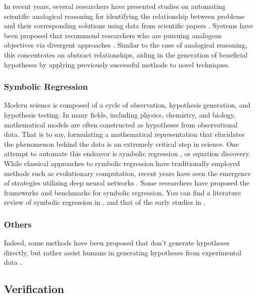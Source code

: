\documentclass{book}
\begin{document}
In recent years, several researchers have presented studies on automating scientific analogical reasoning for identifying the relationship between problems and their corresponding solutions using data from scientific papers \cite{kang2022augmenting,chan2018solvent}. 
Systems have been proposed that recommend researchers who are pursuing analogous objectives via divergent approaches \cite{portenoy2022bursting}. Similar to the case of analogical reasoning, this concentrates on abstract relationships, aiding in the generation of beneficial hypotheses by applying previously successful methods to novel techniques.

\subsubsection{Symbolic Regression} 

Modern science is composed of a cycle of observation, hypothesis generation, and hypothesis testing. In many fields, including physics, chemistry, and biology, mathematical models are often constructed as hypotheses from observational data. That is to say, formulating a mathematical representation that elucidates the phenomenon behind the data is an extremely critical step in science. One attempt to automate this endeavor is symbolic regression \cite{makke2022interpretable}, or equation discovery. While classical approaches to symbolic regression have traditionally employed methods such as evolutionary computation, recent years have seen the emergence of strategies utilizing deep neural networks \cite{petersen2019deep,udrescu2020ai,udrescu2020ai2,cranmer2020discovering,kamienny2022end,d2022deep}. Some researchers have proposed the frameworks \cite{landajuela2022unified,keren2023computational} and benchmarks \cite{matsubara2022rethinking} for symbolic regression. You can find a literature review of symbolic regression in \cite{makke2022interpretable}, and that of the early studies in \cite{kramer2023automated}.

\subsubsection{Others} 

Indeed, some methods have been proposed that don't generate hypotheses directly, but rather assist humans in generating hypotheses from experimental data 
 \cite{friederich2021scientific}.

\subsection{Verification}
\end{document}
